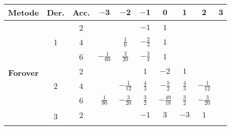 \begin{table}[H]
  \centering
  \setlength{\tabcolsep}{5pt}
  \renewcommand{\arraystretch}{1.2}
  \begin{tabular}{|c|c|c|c|c|c|c|c|c|c|}
    \hline
    \rowcolor{cyan!20} \textbf{\footnotesize{Metode}} & \textbf{\footnotesize{Der.}} & \textbf{\footnotesize Acc.} & $\mathbf{-3}$    & $\mathbf{-2}$    & $\mathbf{-1}$   & $\mathbf{0}$     & $\mathbf{1}$      & $\mathbf{2}$       & $\mathbf{3}$     \\ \hline

    \multirow{12}{*}{\textbf{\footnotesize{Forover}}}
                                                      & \multirow{3}{*}{1}           & 2                           &                  &                  & $-1$            & $1$              &                   &                    &                  \\ \cline{3-10}
                                                      &                              & 4                           &                  & $\frac{1}{6}$    & $-\frac{2}{3}$  & $1$              &                   &                    &                  \\ \cline{3-10}
                                                      &                              & 6                           & $-\frac{1}{60}$  & $\frac{3}{20}$   & $-\frac{3}{4}$  & $1$              &                   &                    &                  \\ \cline{2-10}
                                                      & \multirow{3}{*}{2}           & 2                           &                  &                  & $1$             & $-2$             & $1$               &                    &                  \\ \cline{3-10}
                                                      &                              & 4                           &                  & $-\frac{1}{12}$  & $\frac{4}{3}$   & $-\frac{5}{2}$   & $\frac{4}{3}$     & $-\frac{1}{12}$    &                  \\ \cline{3-10}
                                                      &                              & 6                           & $\frac{1}{90}$   & $-\frac{3}{20}$  & $\frac{3}{2}$   & $-\frac{49}{18}$ & $\frac{3}{2}$     & $-\frac{3}{20}$    &                  \\ \cline{2-10}
                                                      & \multirow{3}{*}{3}           & 2                           &                  &                  & $-1$            & $3$              & $-3$              & $1$                &                  \\ \cline{3-10}

\end{tabular}
\end{table}

